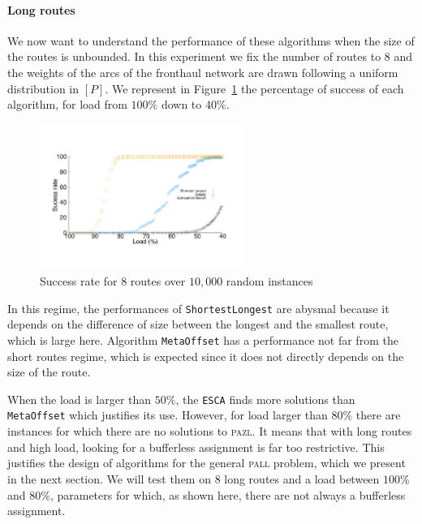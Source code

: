 \documentclass[a4paper,10pt]{article}
\newcommand\shortestlongest{\texttt{ShortestLongest}\xspace}
\newcommand\metaoffset{\texttt{MetaOffset}\xspace}
\newcommand\ESCA{\texttt{ESCA}\xspace}
\newcommand\pazl{\textsc{pazl}\xspace}
\newcommand\pall{\textsc{pall}\xspace}
\begin{document}
        \paragraph{Long routes}
      
      We now want to understand the performance of these algorithms when the size of the routes is unbounded. In this experiment we fix the number of routes to $8$ and the weights of the arcs of the fronthaul network are drawn following a uniform distribution in $[P]$. We represent in Figure~\ref{fig:long} the percentage of success of each algorithm, for load from $100\%$ down to $40\%$.
\begin{figure}[h]

       \begin{center}
      \includegraphics[width=0.6\textwidth]{echec_longues.pdf}
      \end{center}
        
      \caption{Success rate for $8$ routes over $10,000$ random instances}\label{fig:long}
     \end{figure}
      
In this regime, the performances of \shortestlongest are abysmal because it depends on the difference of size between the longest and the smallest route, which is large here.  Algorithm \metaoffset has a performance not far from the short routes regime, which is expected since it does not directly depends on the size of the route. 
      
       When the load is larger than $50\%$, the \ESCA finds more solutions than \metaoffset which justifies its use. However, for load larger than $80\%$ there are instances for which there are no solutions to \pazl. It means that with long routes and high load, looking for a bufferless assignment is far too restrictive. This justifies the design of algorithms for the general \pall problem, which we present in the next section. We will test them on $8$ long routes and a load between $100\%$ and $80\%$, parameters for which, as shown here, there are not always a bufferless assignment.
      
\end{document}
